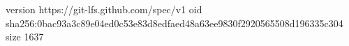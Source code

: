 version https://git-lfs.github.com/spec/v1
oid sha256:0bac93a3c89e04ed0c53e83d8edfaed48a63ee9830f2920565508d196335c304
size 1637
